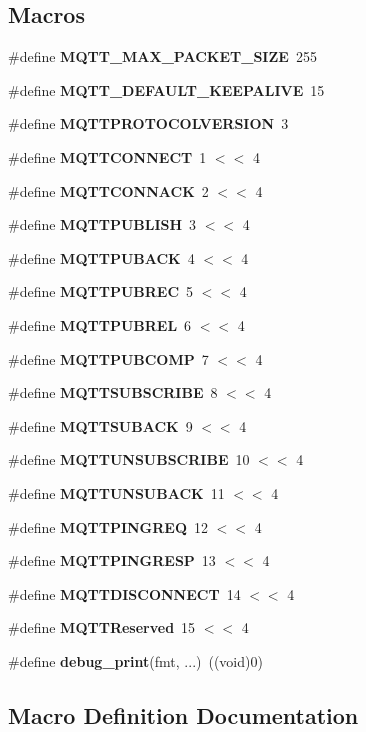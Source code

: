 \subsection*{Macros}
\begin{DoxyCompactItemize}
\item 
\#define \textbf{ M\+Q\+T\+T\+\_\+\+M\+A\+X\+\_\+\+P\+A\+C\+K\+E\+T\+\_\+\+S\+I\+ZE}~255
\item 
\#define \textbf{ M\+Q\+T\+T\+\_\+\+D\+E\+F\+A\+U\+L\+T\+\_\+\+K\+E\+E\+P\+A\+L\+I\+VE}~15
\item 
\#define \textbf{ M\+Q\+T\+T\+P\+R\+O\+T\+O\+C\+O\+L\+V\+E\+R\+S\+I\+ON}~3
\item 
\#define \textbf{ M\+Q\+T\+T\+C\+O\+N\+N\+E\+CT}~1 $<$$<$ 4
\item 
\#define \textbf{ M\+Q\+T\+T\+C\+O\+N\+N\+A\+CK}~2 $<$$<$ 4
\item 
\#define \textbf{ M\+Q\+T\+T\+P\+U\+B\+L\+I\+SH}~3 $<$$<$ 4
\item 
\#define \textbf{ M\+Q\+T\+T\+P\+U\+B\+A\+CK}~4 $<$$<$ 4
\item 
\#define \textbf{ M\+Q\+T\+T\+P\+U\+B\+R\+EC}~5 $<$$<$ 4
\item 
\#define \textbf{ M\+Q\+T\+T\+P\+U\+B\+R\+EL}~6 $<$$<$ 4
\item 
\#define \textbf{ M\+Q\+T\+T\+P\+U\+B\+C\+O\+MP}~7 $<$$<$ 4
\item 
\#define \textbf{ M\+Q\+T\+T\+S\+U\+B\+S\+C\+R\+I\+BE}~8 $<$$<$ 4
\item 
\#define \textbf{ M\+Q\+T\+T\+S\+U\+B\+A\+CK}~9 $<$$<$ 4
\item 
\#define \textbf{ M\+Q\+T\+T\+U\+N\+S\+U\+B\+S\+C\+R\+I\+BE}~10 $<$$<$ 4
\item 
\#define \textbf{ M\+Q\+T\+T\+U\+N\+S\+U\+B\+A\+CK}~11 $<$$<$ 4
\item 
\#define \textbf{ M\+Q\+T\+T\+P\+I\+N\+G\+R\+EQ}~12 $<$$<$ 4
\item 
\#define \textbf{ M\+Q\+T\+T\+P\+I\+N\+G\+R\+E\+SP}~13 $<$$<$ 4
\item 
\#define \textbf{ M\+Q\+T\+T\+D\+I\+S\+C\+O\+N\+N\+E\+CT}~14 $<$$<$ 4
\item 
\#define \textbf{ M\+Q\+T\+T\+Reserved}~15 $<$$<$ 4
\item 
\#define \textbf{ debug\+\_\+print}(fmt, ...)~((void)0)
\end{DoxyCompactItemize}


\subsection{Macro Definition Documentation}
\mbox{\label{_m_q_t_t_8h_a7377cc956f5c81538f0fbf0a0492a539}} 
